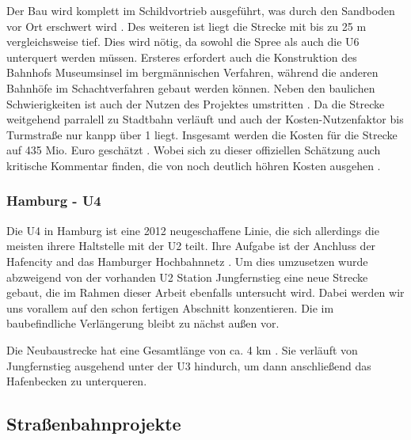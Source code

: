 Der Bau wird komplett im Schildvortrieb ausgeführt, was durch den Sandboden vor
Ort erschwert wird \cite{baukammerHeftU5}. Des weiteren ist liegt die Strecke
mit bis zu 25 m vergleichsweise tief. Dies wird nötig, da sowohl die Spree als
auch die U6 unterquert werden müssen. Ersteres erfordert auch die Konstruktion
des Bahnhofs Museumsinsel im bergmännischen Verfahren, während die anderen
Bahnhöfe im Schachtverfahren gebaut werden können. Neben den baulichen
Schwierigkeiten ist auch der Nutzen des Projektes umstritten \cite{ftdU5}. Da
die Strecke weitgehend parralell zu Stadtbahn verläuft und auch der
Kosten-Nutzenfaktor bis Turmstraße nur kanpp über 1 liegt. Insgesamt werden die
Kosten für die Strecke auf 435 Mio. Euro geschätzt \cite{berlinWebsiteU5}. Wobei
sich zu dieser offiziellen Schätzung auch kritische Kommentar finden, die von
noch deutlich höhren Kosten ausgehen \cite{ftdU5}.

\subsubsection*{Hamburg - U4}

Die U4 in Hamburg ist eine 2012 neugeschaffene Linie, die sich allerdings die
meisten ihrere Haltstelle mit der U2 teilt. Ihre Aufgabe ist der Anchluss der
Hafencity and das Hamburger Hochbahnnetz \cite{keuchelHamburg}. Um dies
umzusetzen wurde abzweigend von der vorhanden U2 Station Jungfernstieg eine neue
Strecke gebaut, die im Rahmen dieser Arbeit ebenfalls untersucht wird. Dabei
werden wir uns vorallem auf den schon fertigen Abschnitt konzentieren. Die
im baubefindliche Verlängerung bleibt zu nächst außen vor.

Die Neubaustrecke hat eine Gesamtlänge von ca. 4 km \cite{keuchelHamburg}. Sie verläuft von
Jungfernstieg ausgehend unter der U3 hindurch, um dann anschließend das
Hafenbecken zu unterqueren. 


\subsection{Straßenbahnprojekte}

